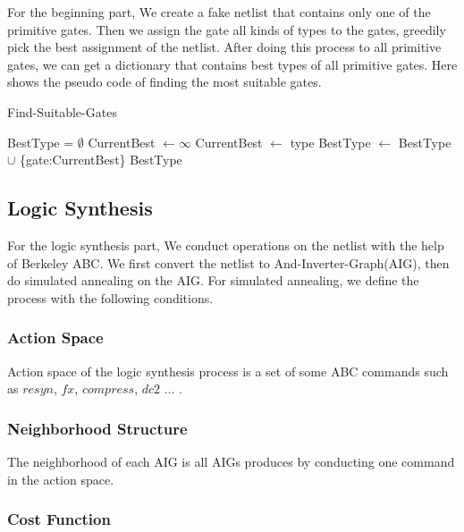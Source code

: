 \documentclass[conference]{IEEEtran}
\begin{document}
For the beginning part, We create a fake netlist that contains only one of the primitive gates. Then we assign the gate all kinds of types to the gates, greedily pick the best assignment of the netlist. After doing this process to all primitive gates, we can get a dictionary that contains best types of all primitive gates. Here shows the pseudo code of finding the most suitable gates.

\begin{algorithm}
\begin{algorithmic}[1]
    \caption{Find-Suitable-Gates}\label{euclid}
    \State BestType = $\emptyset $
    \State CurrentBest $\gets \infty$ 
                \State CurrentBest $\gets$ type
            \EndIf
        \EndFor
        \State BestType $\gets $ BestType $\cup $ \{gate:CurrentBest\}
    \EndFor
    \State \Return BestType
\end{algorithmic}
\end{algorithm}

\subsection{Logic Synthesis}

For the logic synthesis part, We conduct operations on the netlist with the help of Berkeley ABC. We first convert the netlist to And-Inverter-Graph(AIG), then do simulated annealing on the AIG. For simulated annealing, we define the process with the following conditions.\\

\subsubsection{Action Space}

Action space of the logic synthesis process is a set of some ABC commands such as $resyn$, $fx$, $compress$, $dc2$ $\dots$ .

\subsubsection{Neighborhood Structure}

The neighborhood of each AIG is all AIGs produces by conducting one command in the action space.

\subsubsection{Cost Function}
\end{document}
